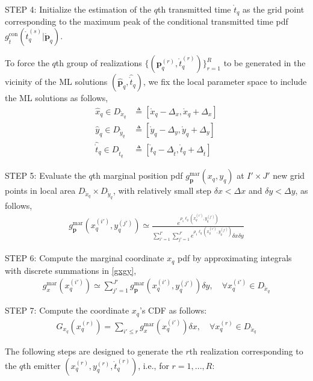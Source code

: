 \documentclass[review]{elsarticle}
\begin{document}
STEP 4: Initialize the estimation of the $q$th transmitted time $\mathring{t}_q$ as the grid point corresponding to the maximum peak of the conditional transmitted time pdf $g_{\mathring{t}}^{\text{con}}(\mathring{t}_q^{(s)} \vert \mathring{\boldsymbol{p}}_q)$.

To force the $q$th group of realizations $\lbrace(\boldsymbol{p}_q^{(r)},\mathring{t}_q^{(r)})\rbrace_{r=1}^{R}$ to be generated in the vicinity of the ML solutions $(\hat{\boldsymbol{p}}_q,\hat{\mathring{t}}_q)$, we fix the local parameter space to include the ML solutions as follows,
\begin{align}
    \hat{x}_q\in D_{\mathring{x}_q}&\triangleq[\mathring{x}_q-\Delta_x,\mathring{x}_q+\Delta_x]\\
    \hat{y}_q\in D_{\mathring{y}_q}&\triangleq[\mathring{y}_q-\Delta_y,\mathring{y}_q+\Delta_y]\\
    \hat{\mathring{t}}_q\in D_{\mathring{t}_q}&\triangleq[\mathring{t}_q-\Delta_{\mathring{t}},\mathring{t}_q+\Delta_{\mathring{t}}]
\end{align}

STEP 5: Evaluate the $q$th marginal position pdf $g_{\boldsymbol{p}}^{\text{mar}}(x_q,y_q)$ at $I'\times J'$ new grid points in local area $D_{\mathring{x}_q}\times D_{\mathring{y}_q}$, with relatively small step $\delta x<\Delta x$ and $\delta y<\Delta y$, as follows,
\begin{align}\label{step5}
    g_{\boldsymbol{p}}^{\text{mar}}(x_q^{(i')},y_q^{(j')})\simeq\frac{e^{\rho_1\ell_q (x_q^{(i')},y_q^{(j')})}}{\sum_{i'=1}^{I'}\sum_{j'=1}^{J'}e^{\rho_1\ell_q (x_q^{(i')},y_q^{(j')})}\delta x\delta y}
\end{align}

STEP 6: Compute the marginal coordinate $x_q$ pdf by approximating integrals with discrete summations in \eqref{gxgy},
\begin{align}
    g_{x}^{\text{mar}}(x_q^{(i')})\simeq \sum_{j'=1}^{J'} g_{\boldsymbol{p}}^{\text{mar}}(x_q^{(i')},y_q^{(j')})\delta y, \quad \forall x_q^{(i')}\in D_{\mathring{x}_q}
\end{align}

STEP 7: Compute the coordinate $x_q$'s CDF as follows:
\begin{align}\label{Gxq}
    G_{x_q}(x_q^{(r)})=\sum_{i'\leq r} g_{x}^{\text{mar}}(x_q^{(i')})\delta x, \quad \forall x_q^{(r)}\in D_{\mathring{x}_q} 
\end{align}

The following steps are designed to generate the $r$th realization corresponding to the $q$th emitter $(x_q^{(r)},y_q^{(r)},\mathring{t}_q^{(r)})$, i.e., for $r=1,...,R$:
\end{document}
